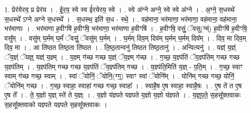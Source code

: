 \documentclass[17pt]{extarticle}
\begin{document}
1. प्रेर॑येरय॒ प्र प्रेर॑य । . ई॒र॒य॒ स्वे स्व ई॑रयेरय॒ स्वे । . स्वे अ॑ग्ने अग्ने॒ स्वे स्वे अ॑ग्ने । . अ॒ग्ने॒ स॒धस्थे॑ स॒धस्थे᳚ ऽग्ने अग्ने स॒धस्थे᳚ । . स॒धस्थ॒ इति॑ स॒ध - स्थे॒ । . वह॑माना॒ भर॑माणा॒ भर॑माणा॒ वह॑माना॒ वह॑माना॒ भर॑माणाः । . भर॑माणा ह॒वीꣳषि॑ ह॒वीꣳषि॒ भर॑माणा॒ भर॑माणा ह॒वीꣳषि॑ । . ह॒वीꣳषि॒ वसुं॒ ॅवसु(ग्म्॑) ह॒वीꣳषि॑ ह॒वीꣳषि॒ वसु᳚म् । . वसु॑म् घ॒र्मम् घ॒र्मं ॅवसुं॒ ॅवसु॑म् घ॒र्मम् । . घ॒र्मम् दिव॒म् दिव॑म् घ॒र्मम् घ॒र्मम् दिव᳚म् । . दिव॒ मा दिव॒म् दिव॒ मा । . आ ति॑ष्ठत तिष्ठ॒ता ति॑ष्ठत । . ति॒ष्ठ॒तान्वनु॑ तिष्ठत तिष्ठ॒तानु॑ । . अन्वित्यनु॑ । . यज्ञ्॑ य॒ज्ञ्ं ॅय॒ज्ञ्ं ॅयज्ञ्॒ यज्ञ्॑ य॒ज्ञ्म् । . य॒ज्ञ्म् ग॑च्छ गच्छ य॒ज्ञ्ं ॅय॒ज्ञ्म् ग॑च्छ । . ग॒च्छ॒ य॒ज्ञ्प॑तिं ॅय॒ज्ञ्प॑तिम् गच्छ गच्छ य॒ज्ञ्प॑तिम् । . य॒ज्ञ्प॑तिम् गच्छ गच्छ य॒ज्ञ्प॑तिं ॅय॒ज्ञ्प॑तिम् गच्छ । . य॒ज्ञ्प॑ति॒मिति॑ य॒ज्ञ् - प॒ति॒म् । . ग॒च्छ॒ स्वाꣳ स्वाम् ग॑च्छ गच्छ॒ स्वाम् । . स्वां ॅयोनिं॒ ॅयोनि॒(ग्ग्॒) स्वाꣳ स्वां ॅयोनि᳚म् । . योनि॑म् गच्छ गच्छ॒ योनिं॒ ॅयोनि॑म् गच्छ । . ग॒च्छ॒ स्वाहा॒ स्वाहा॑ गच्छ गच्छ॒ स्वाहा᳚ । . स्वाहै॒ष ए॒ष स्वाहा॒ स्वाहै॒षः । . ए॒ष ते॑ त ए॒ष ए॒ष ते᳚ । . ते॒ य॒ज्ञो य॒ज्ञ् स्ते॑ ते य॒ज्ञ्ः । . य॒ज्ञो य॑ज्ञ्पते यज्ञ्पते य॒ज्ञो य॒ज्ञो य॑ज्ञ्पते । . य॒ज्ञ्॒प॒ते॒ स॒हसू᳚क्तवाकः स॒हसू᳚क्तवाको यज्ञ्पते यज्ञ्पते स॒हसू᳚क्तवाकः । \newline
\end{document}
